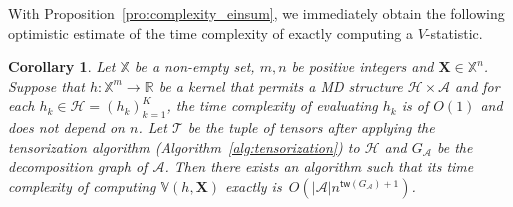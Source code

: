 \documentclass[12pt]{article}
\newcommand{\libref}[2]{\href{#2}{\texttt{#1}}}
\theoremstyle{plain}
\newtheorem{lemma}{Lemma}
\newtheorem{corollary}{Corollary}
\theoremstyle{definition}
\newcommand{\vstat}{\mathbb{V}}
\newcommand{\samplespace}{\bbX}
\newcommand{\degp}[2]{\deg(#1,#2)}
\newcommand{\treewidthp}[1]{\mathsf{tw}(#1)}
\newcommand{\graphform}[1]{G_{#1}}
\newcommand{\less}{O}
\newcommand{\eliminatevg}[2]{\mathsf{elim}_{#1}(#2)}
\newcommand{\Lin}[1]{{\color{purple}{#1}}}
\newcommand{\bbR}{{\mathbb{R}}}
\def\bbX{\mathbb{X}}
\def\calA{\mathcal{A}}
\def\calT{\mathcal{T}}
\def\calH{\mathcal{H}}
\begin{document}
\begin{bibunit}[agsm]
With Proposition~\ref{pro:complexity_einsum}, we immediately obtain the following optimistic estimate of the time complexity of exactly computing a $V$-statistic.

\begin{corollary}\label{pro:complexity_v}
Let $\bbX$ be a non-empty set, $m, n$ be positive integers and $\bm{X} \in \samplespace^n$. Suppose that $h: \bbX^{m} \rightarrow \bbR$ be a kernel that permits a MD structure $\calH \times \calA$ and for each $h_k \in \calH = (h_k)_{k = 1}^{K}$, the time complexity of evaluating $h_k$ is of $O (1)$ and does not depend on $n$. Let $\calT$ be the tuple of tensors after applying the tensorization algorithm (Algorithm~\ref{alg:tensorization}) to $\calH$ and $G_\calA$ be the decomposition graph of $\calA$. Then there exists an algorithm such that its time complexity of computing $\vstat(h,\bm{X})$ exactly is~$\less(|\calA| n^{\treewidthp{G_\calA}+1})$. 
\end{corollary}







\end{bibunit}
\end{document}
